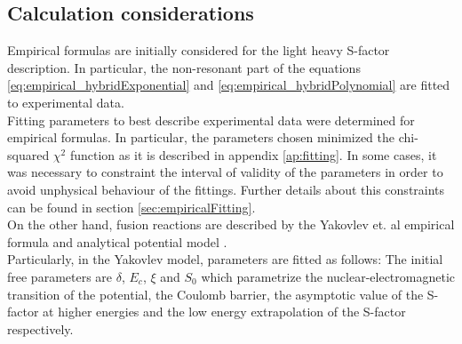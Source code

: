 \documentclass[openany]{book}
\begin{document}
 
 
 
\subsection{Calculation considerations} \label{sub:considerationsNonResonant}

Empirical formulas are initially considered for the light heavy S-factor description. In particular, the non-resonant part of the equations \ref{eq:empirical_hybridExponential}  and \ref{eq:empirical_hybridPolynomial} are fitted to experimental data.  \\

Fitting parameters to best describe experimental data were determined for empirical formulas. In particular, the parameters chosen minimized the chi-squared $\chi^2$ function as it is described in appendix \ref{ap:fitting}. In some cases, it was necessary to constraint the interval of validity of the parameters in order to avoid unphysical behaviour of the fittings. Further details about this constraints can be found in section \ref{sec:empiricalFitting}. \\

On the other hand, fusion reactions are described by the Yakovlev et. al empirical formula \cite{beard_afanasjev_chamon_gasques_wiescher_yakovlev_2010} and analytical potential model  \cite{yakovlev_beard_gasques_wiescher_2010}.  \\

Particularly, in the Yakovlev model, parameters are fitted as follows: The initial free parameters are $\delta$, $E_c$,  $\xi$ and $S_0$ which parametrize the nuclear-electromagnetic transition of the potential, the Coulomb barrier, the asymptotic value of the S-factor at higher energies and the low energy extrapolation of the S-factor respectively.  \\
\end{document}
